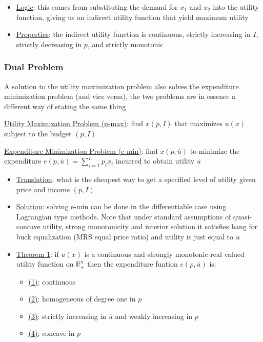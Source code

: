\documentclass{article}
\begin{document}
  \begin{itemize}
    \item  \underline{Logic}: this comes from substituting the demand for $x_{1}$ and $x_{2}$ into the utility function, giving us an indirect utility function that yield maximum utility
    \item  \underline{Properties}: the indirect utility function is continuous, strictly increasing in $I$, strictly decreasing in $p$, and strictly monotonic
  \end{itemize}
  \par
\vspace{6mm}
\subsubsection{Dual Problem}
A solution to the utility maximization problem also solves the expenditure minimization problem (and vice versa), the two problems are in essence a different way of stating the same thing \par \vspace{0.3em}
  \underline{Utility Maximization Problem (u-max)}: find $x(p, I)$ that maximizes $u(x)$ subject to the budget $(p, I)$
  \par
  \underline{Expenditure Minimization Problem (e-min)}: find $x(p, \overline{u})$ to minimize the expenditure $e(p,\overline{u}) = \sum_{i=1}^{n}p_{i}x_{i}$ incurred to obtain utility $\overline{u}$
  \begin{itemize}
    \item  \underline{Translation}: what is the cheapest way to get a specified level of utility given price and income $(p, I)$
    \item  \underline{Solution}: solving e-min can be done in the differentiable case using Lagrangian type methods. Note that under standard assumptions of quasi-concave utility, strong monotonicity and interior solution it satisfies bang for buck equalization (MRS equal price ratio) and utility is just equal to $\overline{u}$
    \item  \underline{Theorem 1}: if $u(x)$ is a continuous and strongly monotonic real valued utility function on $\mathbb{R}_{+}^{n}$ then the expenditure funtion $e(p, \overline{u})$ is:
    \begin{itemize}
      \item  \underline{(1)}: continuous
      \item  \underline{(2)}: homogeneous of degree one in $p$
      \item  \underline{(3)}: strictly increasing in $\overline{u}$ and weakly increasing in $p$
      \item  \underline{(4)}: concave in $p$
    \end{itemize}
  \end{itemize}
\end{document}
